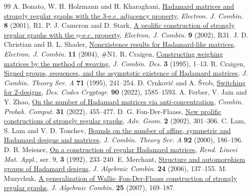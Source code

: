 \documentclass[11pt,reqno]{amsart}
\theoremstyle{remark}\newtheorem{remark}[theorem]{Remark}
\begin{document}
\begin{thebibliography}{99}
 A. Bonato, W. H. Holzmann and H. Kharaghani,
\href{https://www.combinatorics.org/ojs/index.php/eljc/article/download/v8i1r1/pdf}{Hadamard matrices and strongly regular graphs with the 3-e.c. adjacency property},
\emph{Electron. J. Combin.} \textbf{8} (2001), R1.
 P. J. Cameron and D. Stark,
\href{https://webspace.maths.qmul.ac.uk/p.j.cameron/preprints/nec.pdf}{A prolific construction of strongly regular graphs with the \(n\)-e.c. property},
\emph{Electron. J. Combin.} \textbf{9} (2002), R31.
 J. D. Christian and B. L. Shader,
\href{https://www.maths.tcd.ie/EMIS/journals/EJC/Volume_11/PDF/v11i1n1.pdf}{Nonexistence results for Hadamard-like matrices},
\emph{Electron. J. Combin.} \textbf{11} (2004), \#N1.
 R. Craigen,
\href{https://doi.org/10.1002/jcd.3180030103}{Constructing weighing matrices by the method of weaving},
\emph{J. Combin. Des.} \textbf{3} (1995), 1--13.
 R. Craigen,
\href{https://doi.org/10.1016/0097-3165(95)90002-0}{Signed groups, sequences, and the asymptotic existence of Hadamard matrices},
\emph{J. Combin. Theory Ser. A} \textbf{71} (1995), 241--254.
 D. Crnkovi\'c and A. \v Svob,
\href{https://doi.org/10.1007/s10623-022-01059-7}{Switching for 2-designs},
\emph{Des. Codes Cryptogr.} \textbf{90} (2022), 1585--1593.
 A. Ferber, V. Jain and Y. Zhao, \href{https://doi.org/10.1017/S0963548321000377}{On the number of Hadamard matrices via anti-concentration}, \emph{Combin. Probab. Comput.} \textbf{31} (2022), 455--477.
 D. G. Fon-Der-Flaass,
\href{https://www.emis.de/ft/50567}{New prolific constructions of strongly regular graphs},
\emph{Adv. Geom.} \textbf{2} (2002), 301--306.
 C. Lam, S. Lam and V. D. Tonchev,
\href{https://doi.org/10.1006/jcta.2000.3060}{Bounds on the number of affine, symmetric and Hadamard designs and matrices},
\emph{J. Combin. Theory Ser. A} \textbf{92} (2000), 186--196.
 D. B. Meisner,
\href{https://www.bdim.eu/item?fmt=pdf&id=RLIN_1992_9_3_4_233_0}{On a construction of regular Hadamard matrices},
\emph{Rend. Lincei Mat. Appl.}, ser. 9, \textbf{3} (1992), 233--240.
 E. Merchant,
\href{https://doi.org/10.1007/s10801-006-0012-9}{Structure and automorphism groups of Hadamard designs},
\emph{J. Algebraic Combin.} \textbf{24} (2006), 137--155.
 M. Muzychuk,
\href{https://emis.de/ft/43722}{A generalization of Wallis--Fon-Der-Flaass construction of strongly regular graphs},
\emph{J. Algebraic Combin.} \textbf{25} (2007), 169--187.

\end{thebibliography}
\end{document}
